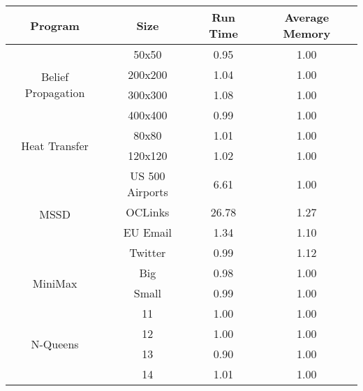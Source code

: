 \begin{tabular}{c | c || c | c} \hline
	\textbf{Program} & \textbf{Size} & \textbf{Run Time} & \textbf{Average Memory}\\ \hline \hline
	\multirow{4}{*}{Belief Propagation}  & 50x50 &  0.95  &  1.00
  \\
		 & 200x200 &  1.04  &  1.00
  \\
		 & 300x300 &  1.08  &  1.00
  \\
		 & 400x400 &  0.99  &  1.00
  \\
	\hline
	\multirow{2}{*}{Heat Transfer}  & 80x80 &  1.01  &  1.00
  \\
		 & 120x120 &  1.02  &  1.00
  \\
	\hline
	\multirow{4}{*}{MSSD}  & US 500 Airports &  6.61  &  1.00
  \\
		 & OCLinks &  26.78  &  1.27
  \\
		 & EU Email &  1.34  &  1.10
  \\
		 & Twitter &  0.99  &  1.12
  \\
	\hline
	\multirow{2}{*}{MiniMax}  & Big &  0.98  &  1.00
  \\
		 & Small &  0.99  &  1.00
  \\
	\hline
	\multirow{4}{*}{N-Queens}  & 11 &  1.00  &  1.00
  \\
		 & 12 &  1.00  &  1.00
  \\
		 & 13 &  0.90  &  1.00
  \\
		 & 14 &  1.01  &  1.00
  \\
	\hline
\end{tabular}
